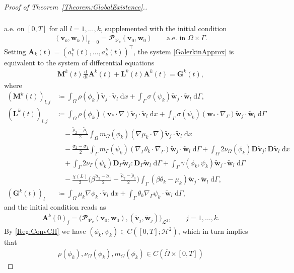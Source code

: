 \documentclass[10pt,reqno]{amsart}
\theoremstyle{remark}
\numberwithin{equation}{section}
\newcommand{\scp}[2]{ ( #1 , #2  )}
\newcommand{\bv}{\mathbf{v}}
\newcommand{\bw}{\mathbf{w}}
\newcommand{\tv}{\widetilde{\bv}}
\newcommand{\tw}{\widetilde{\bw}}
\newcommand{\D}{\mathbf{D}}
\newcommand{\A}{\mathbf{A}}
\newcommand{\M}{\mathbf{M}}
\renewcommand{\L}{\mathbf{L}}
\newcommand{\G}{\mathbf{G}}
\newcommand{\Dg}{\mathbf{D}_\Gamma}
\newcommand{\intO}{\int_\Omega}
\newcommand{\intG}{\int_\Gamma}
\newcommand{\dx}{\;\mathrm{d}x}
\newcommand{\dG}{\;\mathrm d\Ga}
\newcommand{\ddt}{\frac{\mathrm d}{\mathrm dt}}
\newcommand{\Grad}{\nabla}
\newcommand{\Gradg}{\nabla_\Ga}
\newcommand{\Om}{\Omega}
\newcommand{\Ga}{\Gamma}
\begin{document}
\begin{proof}[Proof of Theorem~\ref{Theorem:GlobalExistence}.]
\begin{align}
\begin{split}
    \end{split}
\end{align}
a.e. on $[0,T]$ for all $l=1,\ldots,k$, supplemented with the initial condition 
\begin{align}\label{Galerkin:InitialCondition}
    \scp{\bv_k}{\bw_k}\vert_{t=0} = \mathbfcal{P}_{\mathbfcal{V}_k}(\bv_0,\bw_0) \qquad\text{a.e. in~}\Om\times\Ga.
\end{align}
Setting $\A_k(t) = (a_1^k(t),\ldots,a_k^k(t))^\top$, the system \eqref{GalerkinApprox} is equivalent to the system of differential equations
\begin{align}
    \label{ODE:Galerkin}
    \M^k(t)\ddt \A^k(t) + \L^k(t)\A^k(t) = \G^k(t),
\end{align}
where
\begin{align*}
    (\M^k(t))_{l,j} &\coloneqq \intO \rho(\phi_k)\tv_j\cdot\tv_l \dx + \intG \sigma(\psi_k)\tw_j\cdot\tw_l\dG, \\
    (\L^k(t))_{l,j} &\coloneqq \intO \rho(\phi_k)(\bv_\ast\cdot\Grad)\tv_j\cdot\tv_l\dx + \intG \sigma(\psi_k)(\bw_\ast\cdot\Gradg)\tw_j\cdot\tw_l\dG \\
    &\quad - \frac{\tilde\rho_2 - \tilde\rho_1}{2}\intO m_\Om(\phi_k)(\Grad\mu_k\cdot\Grad)\tv_j\cdot\tv_l\dx \\
    &\quad - \frac{\tilde\sigma_2 - \tilde\sigma_1}{2}\intG m_\Ga(\psi_k)(\Gradg\theta_k\cdot\Gradg)\tw_j\cdot\tw_l\dG + \intO 2\nu_\Om(\phi_k)\D\tv_j:\D\tv_l\dx \\
    &\quad + \intG 2\nu_\Ga(\psi_k)\Dg\tw_j:\Dg\tw_l\dG + \intG \gamma(\phi_k,\psi_k)\tw_j\cdot\tw_l\dG \\
    &\quad - \frac{\chi(L)}{2}\Big(\beta\frac{\tilde\sigma_2 - \tilde\sigma_1}{2} - \frac{\tilde\rho_2 - \tilde\rho_1}{2}\Big)\intG (\beta\theta_k - \mu_k)\tw_j\cdot\tw_l\dG, \\
    (\G^k(t))_l &\coloneqq \intO \mu_k\Grad\phi_k\cdot\tv_l\dx + \intG \theta_k\Gradg\psi_k\cdot\tw_l\dG,
\end{align*}
and the initial condition reads as
\begin{align}\label{IC:Galerkin}
    \A^k(0)_j = \big(\mathbfcal{P}_{\mathbfcal{V}_k}(\bv_0,\bw_0),(\tv_j,\tw_j)\big)_{\mathbfcal{L}^2}, \qquad j=1,\ldots,k.
\end{align}
By \eqref{Reg:ConvCH} we have $(\phi_k,\psi_k)\in C([0,T];\mathcal{H}^2)$, which in turn implies that
\begin{align*}
    \rho(\phi_k), \nu_\Om(\phi_k), m_\Om(\phi_k)\in C(\overline\Om\times[0,T])
\end{align*}

\end{proof}
\end{document}
